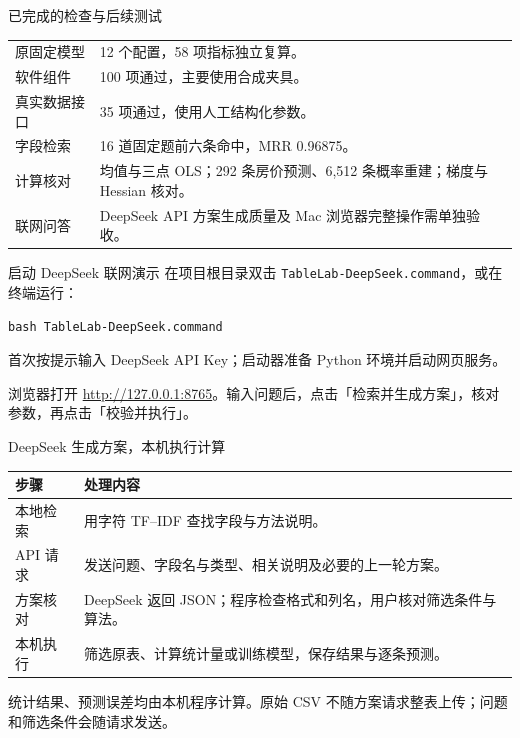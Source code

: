 \documentclass[aspectratio=169,11pt]{beamer}
\newcommand{\code}[1]{\nolinkurl{#1}}
\newcommand{\smallnote}[1]{\par\vspace{1.5mm}{\scriptsize #1\par}}
\begin{document}
\begin{frame}{已完成的检查与后续测试}
\small
\begin{tabularx}{\textwidth}{lY}
\toprule
原固定模型 & 12 个配置，58 项指标独立复算。\\
软件组件 & 100 项通过，主要使用合成夹具。\\
真实数据接口 & 35 项通过，使用人工结构化参数。\\
字段检索 & 16 道固定题前六条命中，MRR 0.96875。\\
计算核对 & 均值与三点 OLS；292 条房价预测、6,512 条概率重建；梯度与 Hessian 核对。\\
联网问答 & DeepSeek API 方案生成质量及 Mac 浏览器完整操作需单独验收。\\
\bottomrule
\end{tabularx}\par
\smallnote{预测指标来自已保存的十二组基准模型；人工方案与模拟接口测试不代表 DeepSeek 自由问答的准确率。}
\end{frame}

\begin{frame}[fragile]{启动 DeepSeek 联网演示}
在项目根目录双击 \code{TableLab-DeepSeek.command}，或在终端运行：
\begin{lstlisting}
bash TableLab-DeepSeek.command
\end{lstlisting}
首次按提示输入 DeepSeek API Key；启动器准备 Python 环境并启动网页服务。
\par\medskip
浏览器打开 \url{http://127.0.0.1:8765}。输入问题后，点击「检索并生成方案」，核对参数，再点击「校验并执行」。
\smallnote{生成新方案需要联网。密钥由终端隐藏输入，默认存入当前用户的 Mac 钥匙串。演示结束在终端按 Control-C。}
\end{frame}

\begin{frame}{DeepSeek 生成方案，本机执行计算}
\begin{tabularx}{\textwidth}{lY}
\toprule
步骤 & 处理内容\\\midrule
本地检索 & 用字符 TF--IDF 查找字段与方法说明。\\
API 请求 & 发送问题、字段名与类型、相关说明及必要的上一轮方案。\\
方案核对 & DeepSeek 返回 JSON；程序检查格式和列名，用户核对筛选条件与算法。\\
本机执行 & 筛选原表、计算统计量或训练模型，保存结果与逐条预测。\\\bottomrule
\end{tabularx}
\par\medskip
统计结果、预测误差均由本机程序计算。原始 CSV 不随方案请求整表上传；问题和筛选条件会随请求发送。
\smallnote{API 不可用时，网页显示错误；保存的例题可用 HTML 回放查看。回放只展示既有记录。}
\end{frame}
\end{document}
